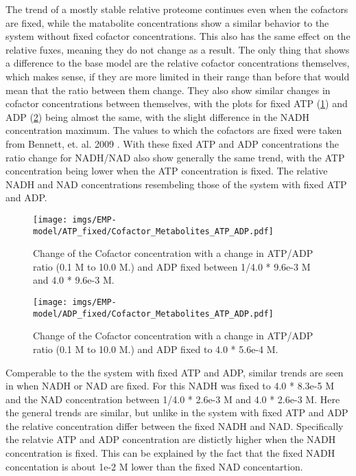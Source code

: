The trend of a mostly stable relative proteome continues even when the cofactors are fixed, while the matabolite concentrations show a similar behavior to the system without fixed cofactor concentrations. This also has the same effect on the relative fuxes, meaning they do not change as a result. The only thing that shows a difference to the base model are the relative cofactor concentrations themselves, which makes sense, if they are more limited in their range than before that would mean that the ratio between them change. They also show similar changes in cofactor concentrations between themselves, with the plots for fixed ATP (\ref{fig:cofactor_atp_fixed_atp}) and ADP (\ref{fig:cofactor_adp_fixed_atp}) being almost the same, with the slight difference in the NADH concentration maximum. 
The values to which the cofactors are fixed were taken from Bennett, et. al. 2009 \cite{bennett2009absolute}. With these fixed ATP and ADP concentrations the ratio change for NADH/NAD also show generally the same trend, with the ATP concentration being lower when the ATP concentration is fixed. The relative NADH and NAD concentrations resembeling those of the system with fixed ATP and ADP.
\begin{figure}[H]
    \centering
    \texttt{[image: imgs/EMP-model/ATP\_fixed/Cofactor\_Metabolites\_ATP\_ADP.pdf]}
    \caption{Change of the Cofactor concentration with a change in ATP/ADP ratio (0.1 M to 10.0 M.) and ADP fixed between 1/4.0 * 9.6e-3 M and 4.0 * 9.6e-3 M.}
    \label{fig:cofactor_atp_fixed_atp}
\end{figure}

\begin{figure}[H]
    \centering
    \texttt{[image: imgs/EMP-model/ADP\_fixed/Cofactor\_Metabolites\_ATP\_ADP.pdf]}
    \caption{Change of the Cofactor concentration with a change in ATP/ADP ratio (0.1 M to 10.0 M.) and ADP fixed to 4.0 * 5.6e-4 M.}
    \label{fig:cofactor_adp_fixed_atp}
\end{figure}

Comperable to the the system with fixed ATP and ADP, similar trends are seen in when NADH or NAD are fixed. For this NADH was fixed to 4.0 * 8.3e-5 M and the NAD concentration between 1/4.0 * 2.6e-3 M and 4.0 * 2.6e-3 M. Here the general trends are similar, but unlike in the system with fixed ATP and ADP the relative concentration differ between the fixed NADH and NAD. Specifically the relatvie ATP and ADP concentration are distictly higher when the NADH concentration is fixed. This can be explained by the fact that the fixed NADH concentation is about 1e-2 M lower than the fixed NAD concentartion.

